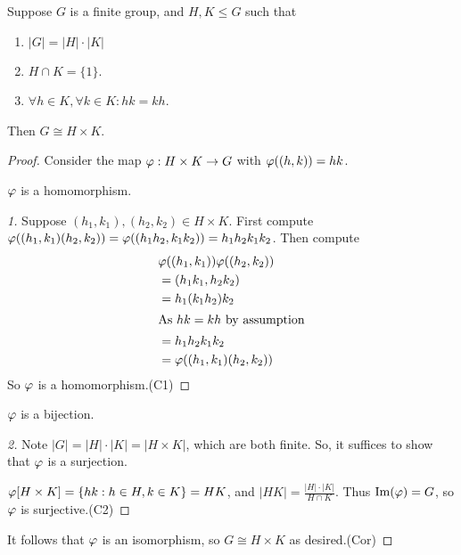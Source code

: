 \documentclass[notes.tex]{subfiles}
\begin{document}
\begin{corollary}
	\label{congtodp}
	Suppose $G$ is a finite group, and $H, K\le G$ such that
	\begin{enumerate}
		\item $|G| = |H|\cdot |K|$
		\item $H\cap K = \{1\}$.
		\item $\forall h\in K, \forall k\in K: hk = kh$.
	\end{enumerate}
	Then $G\cong H\times K$.
\end{corollary}
\begin{proof}
	Consider the map $\varphi:H\times K\to G$ with $\varphi((h, k)) = hk$.

	\begin{claim}[1]
		$\varphi$ is a homomorphism.
	\end{claim}
	\begin{proof}[1]
		Suppose $(h_1, k_1), (h_2, k_2) \in H\times K$.
		First compute $\varphi((h_1, k_1)(h_2, k_2)) = \varphi((h_1h_2, k_1k_2)) = h_1h_2k_1k_2$.
		Then compute
		\begin{align*}
		 	&\varphi((h_1, k_1))\varphi((h_2, k_2))\\
		 	&= (h_1k_1, h_2k_2) \\
		 	&= h_1(k_1h_2)k_2 \\
		 	\shortintertext{As $hk = kh$ by assumption}
		 	&= h_1h_2k_1k_2\\
		 	&=\varphi((h_1, k_1)(h_2, k_2))
		 \end{align*}
		 So $\varphi$ is a homomorphism.\qedhere(C1)
	\end{proof}
	\begin{claim}[2]
		$\varphi$ is a bijection.
	\end{claim}
	\begin{proof}[2]
		Note $|G| = |H|\cdot|K| = |H\times K|$, which are both finite. So, it suffices to show that $\varphi$ is a surjection.

		$\varphi[H\times K] = \{hk:h\in H, k\in K\} = HK$, and $|HK|=\frac{|H|\cdot|K|}{H\cap K}$. Thus $\operatorname{\mathrm{Im}}(\varphi) = G$, so $\varphi$ is surjective.\qedhere(C2)
	\end{proof}
	It follows that $\varphi$ is an isomorphism, so $G\cong H\times K$ as desired.\qedhere(Cor)
\end{proof}
\end{document}
